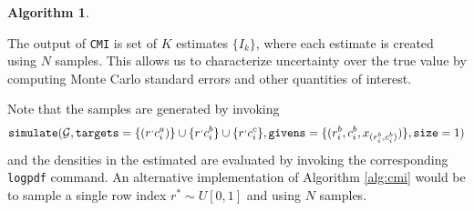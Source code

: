 \documentclass[10pt,letterpaper]{article}
\newtheorem{algorithm}{Algorithm}[section]
\newcommand{\set}[1]{\{#1\}}
\begin{document}
\begin{enumerate}
\begin{algorithm}
    \end{algorithm}

    The output of \texttt{CMI} is set of $K$ estimates $\set{I_k}$, where each
    estimate is created using $N$ samples. This allows us to characterize
    uncertainty over the true value by computing Monte Carlo standard errors and
    other quantities of interest.

    Note that the samples are generated by invoking
    \begin{align*}
    {\tt simulate(} \mathcal{G}, {\tt targets} =
    \set{(r^,c_i^a)}\cup\set{r^,c_i^b}\cup\set{r^,c_i^c}, {\tt givens} =
    \set{(r_i^b,c_i^b,x_{(r_i^b,c_i^b)})}, {\tt size} = 1)
    \end{align*}
    and the densities in the estimated are evaluated by invoking the
    corresponding \texttt{logpdf} command. An alternative implementation of
    Algorithm \ref{alg:cmi} would be to sample a single row index $r^* \sim
    U[0,1]$ and using $N$ samples.
\end{enumerate}
\end{document}
